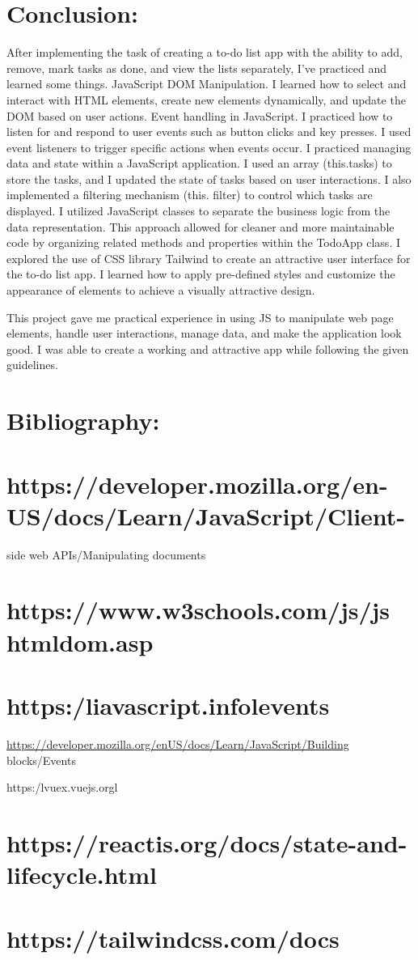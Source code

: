 \documentclass[10pt]{article}
\begin{document}
\section{Conclusion:}
After implementing the task of creating a to-do list app with the ability to add, remove, mark tasks as done, and view the lists separately, I've practiced and learned some things. JavaScript DOM Manipulation. I learned how to select and interact with HTML elements, create new elements dynamically, and update the DOM based on user actions. Event handling in JavaScript. I practiced how to listen for and respond to user events such as button clicks and key presses. I used event listeners to trigger specific actions when events occur. I practiced managing data and state within a JavaScript application. I used an array (this.tasks) to store the tasks, and I updated the state of tasks based on user interactions. I also implemented a filtering mechanism (this. filter) to control which tasks are displayed. I utilized JavaScript classes to separate the business logic from the data representation. This approach allowed for cleaner and more maintainable code by organizing related methods and properties within the TodoApp class. I explored the use of CSS library Tailwind to create an attractive user interface for the to-do list app. I learned how to apply pre-defined styles and customize the appearance of elements to achieve a visually attractive design.

This project gave me practical experience in using JS to manipulate web page elements, handle user interactions, manage data, and make the application look good. I was able to create a working and attractive app while following the given guidelines.

\section{Bibliography:}
\section{https://developer.mozilla.org/en-US/docs/Learn/JavaScript/Client-}
side web APIs/Manipulating documents

\section{https://www.w3schools.com/js/js htmldom.asp}
\section{https:/liavascript.infolevents}
\href{https://developer.mozilla.org/enUS/docs/Learn/JavaScript/Building}{https://developer.mozilla.org/enUS/docs/Learn/JavaScript/Building} blocks/Events

https:/lvuex.vuejs.orgl

\section{https://reactis.org/docs/state-and-lifecycle.html}
\section{https://tailwindcss.com/docs}
\end{document}
